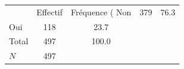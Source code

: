 {
\def\sym#1{\ifmmode^{#1}\else\(^{#1}\)\fi}
\begin{tabular}{l*{1}{cc}}
\toprule
            &    Effectif&Fréquence (%
\midrule
Non         &         379&        76.3\\
Oui         &         118&        23.7\\
Total       &         497&       100.0\\
\midrule
\(N\)       &         497&            \\
\bottomrule
\end{tabular}
}
